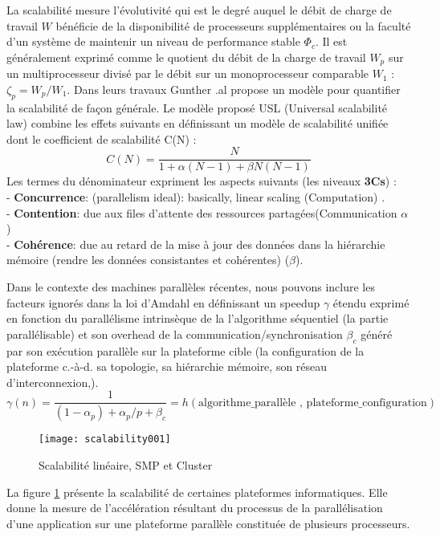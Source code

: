 La scalabilité mesure l'évolutivité qui est le degré auquel le débit de charge de travail $W$ bénéficie de la disponibilité de processeurs supplémentaires ou la faculté d'un système de maintenir un niveau de performance stable $\Phi_c$.
Il est généralement exprimé comme le quotient du débit de la charge de travail $W_p$ sur un multiprocesseur divisé par le débit sur un monoprocesseur comparable $W_1$ : $\zeta_p = W_p/W_1$.
Dans leurs travaux Gunther .al propose un modèle pour quantifier la scalabilité de façon générale. Le modèle proposé USL (Universal scalabilité law) \cite{Gun17} combine les effets suivants en définissant un modèle de scalabilité unifiée dont le coefficient de scalabilité C(N) : 
%
$$ C(N) = \frac{N}{1 + \alpha (N - 1) + \beta N (N - 1)}$$
%
Les termes du dénominateur expriment les aspects suivants (les niveaux \textbf{3Cs}) :\\
- \textbf{Concurrence}: (parallelism ideal): basically, linear scaling (Computation) .\\
- \textbf{Contention}: due aux files d'attente des ressources partagées(Communication $\alpha$)\\  %
- \textbf{Cohérence}: due au retard de la mise à jour des données dans la hiérarchie mémoire (rendre les données consistantes et cohérentes) ($\beta$).

Dans le contexte des machines parallèles récentes, nous pouvons inclure les facteurs ignorés dans la loi d'Amdahl en définissant un speedup $\gamma$ étendu exprimé en fonction du parallélisme intrinsèque de la l'algorithme séquentiel (la partie parallélisable) et son overhead de la communication/synchronisation $\beta_c$ généré par son exécution parallèle sur la plateforme cible (la configuration de la plateforme c.-à-d. sa topologie, sa hiérarchie mémoire, son réseau d’interconnexion,). 
%
$$\gamma(n) = \frac{1}{(1-\alpha_p) + \alpha_p/p + \beta_c} = h( \text{algorithme\_parallèle , plateforme\_configuration})$$
%
\begin{figure}[h]
\texttt{[image: scalability001]}
\centering
\caption{Scalabilité linéaire, SMP et Cluster  \cite{qaca17}}
\label{fig:FG_2_5}
\end{figure}
%
La figure \ref{fig:FG_2_5} présente la scalabilité de certaines plateformes informatiques. Elle donne la mesure de l'accélération résultant du processus de la parallélisation d'une application sur une plateforme parallèle constituée de plusieurs processeurs.

